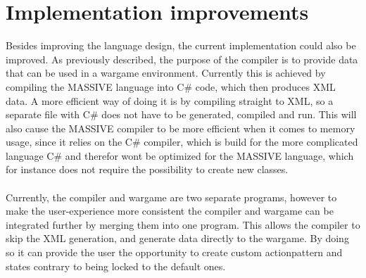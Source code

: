 \section{Implementation improvements}
Besides improving the language design, the current implementation could also be improved. As previously described, the purpose of the compiler is to provide data that can be used in a wargame environment.
Currently this is achieved by compiling the MASSIVE language into C\# code, which then produces XML data. 
A more efficient way of doing it is by compiling straight to XML, so a separate file with C\# does not have to be generated, compiled and run. 
This will also cause the MASSIVE compiler to be more efficient when it comes to memory usage, since it relies on the C\# compiler, which is build for the more complicated language C\# and therefor wont be optimized for the MASSIVE language, which for instance does not require the possibility to create new classes.\\
 \\
Currently, the compiler and wargame are two separate programs, however to make the user-experience more consistent the compiler and wargame can be integrated further by merging them into one program.
This allows the compiler to skip the XML generation, and generate data directly to the wargame. By doing so it can provide the user the opportunity to create custom actionpattern and states contrary to being locked to the default ones.\newline
 \\
